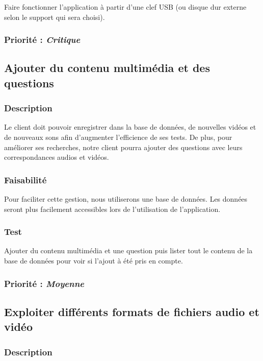 \documentclass[a4paper,twoside,10pt]{report}
\begin{document}
Faire fonctionner l’application à partir d’une clef USB (ou disque dur externe selon le support qui sera choisi).

\subsubsection{Priorité : \textit{Critique}}

\subsection{Ajouter du contenu multimédia et des questions}

\subsubsection{Description}
Le client doit pouvoir enregistrer dans la base de données, de nouvelles vidéos et de nouveaux sons afin d’augmenter l’efficience de ses tests. De plus, pour améliorer ses recherches, notre client pourra ajouter des questions avec leurs correspondances audios et vidéos.

\subsubsection{Faisabilité}

Pour faciliter cette gestion, nous utiliserons une base de données. Les données seront plus facilement accessibles lors de l’utilisation de l’application.

\subsubsection{Test}

Ajouter du contenu multimédia et une question puis lister tout le contenu de la base de données pour voir si l’ajout à été pris en compte.

\subsubsection{Priorité : \textit{Moyenne}}

\subsection{Exploiter différents formats de fichiers audio et vidéo}

\subsubsection{Description}
\end{document}
